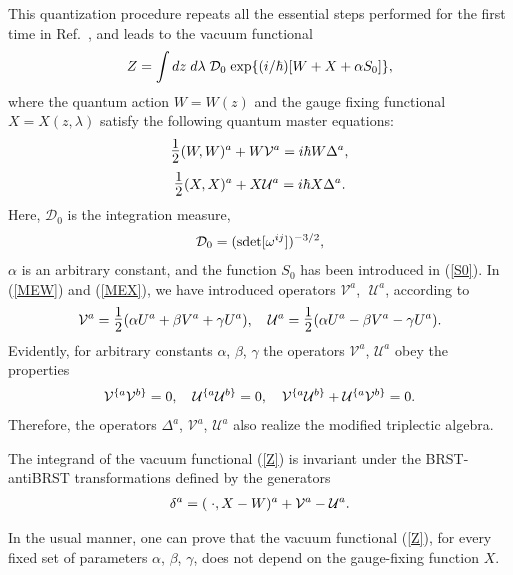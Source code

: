 \documentclass[a4paper,11pt]{article}
\begin{document}
This quantization procedure repeats all the essential steps performed for
the first time in Ref.~\cite{gln}, and leads to the vacuum functional
\begin{eqnarray}
\label{Z}
Z=\int dz \; d\lambda  \;{\cal D}_0\;{\rm exp}
{\{(i/\hbar)[W+X+\alpha S_0]\}},
\end{eqnarray}
where the quantum action $W=W(z)$ and the gauge fixing functional $%
X=X(z,\lambda )$ satisfy the following quantum master equations:
\begin{eqnarray}
\label{MEW} \hbox{\Large$\frac{1}{2}$}(W,W)^a +W{\cal V}^a=i\hbar
W\Delta^a ,
\end{eqnarray}
\begin{eqnarray}
\label{MEX} \hbox{\Large$\frac{1}{2}$}(X,X)^a +X{\cal U}^a=i\hbar
X\Delta^a.
\end{eqnarray}
Here, $\mathcal{D}_{0}$ is the integration measure,
\begin{eqnarray}
\label{mesu}
{\cal D}_0=({\rm sdet}[\omega^{ij}])^{-3/2},
\end{eqnarray}
$\alpha $ is an arbitrary constant, and the function $S_{0}$ has been
introduced in (\ref{S0}). In (\ref{MEW}) and (\ref{MEX}), we have introduced
operators $\mathcal{V}^{a}$, $\;\mathcal{U}^{a}$, according to
\begin{eqnarray}
\label{VU} {\cal V}^a=\hbox{\Large$\frac{1}{2}$}(\alpha U^a+\beta
V^a+\gamma U^a),\quad {\cal U}^a=\hbox{\Large$\frac{1}{2}$}(\alpha
U^a -\beta V^a-\gamma U^a).
\end{eqnarray}
Evidently, for arbitrary constants $\alpha $, $\beta $, $\gamma $ the
operators $\mathcal{V}^{a}$, $\mathcal{U}^{a}$ obey the properties
\begin{eqnarray}
{\cal V}^{\{a}{\cal V}^{b\}}=0,\quad
{\cal U}^{\{a}{\cal U}^{b\}}=0,\quad
{\cal V}^{\{a}{\cal U}^{b\}}+{\cal U}^{\{a}{\cal V}^{b\}}=0.
\end{eqnarray}
Therefore, the operators $\Delta ^{a}$, $\mathcal{V}^{a}$, $\mathcal{U}%
^{a} $ also realize the modified triplectic algebra.

The integrand of the vacuum functional (\ref{Z}) is invariant under the
BRST-antiBRST transformations defined by the generators
\begin{eqnarray}
\label{BRSTg}
 \delta^a=(\;\cdot, X-W)^a +{\cal V}^a-{\cal U}^a.
\end{eqnarray}

In the usual manner, one can prove that the vacuum functional (\ref{Z}), for
every fixed set of parameters $\alpha $, $\beta $, $\gamma $, does not
depend on the gauge-fixing function $X$.
\end{document}
